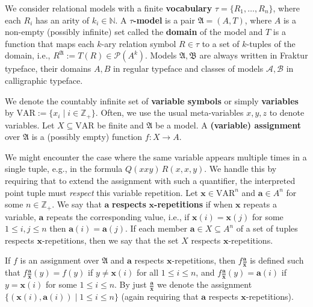 \documentclass{article}
\theoremstyle{definition}
\begin{document}
We consider relational models with a finite \textbf{vocabulary} $\tau=\{R_1,\dots,R_n\}$, where each $R_i$ has an arity of $k_i\in\mathbb{N}$. A $\tau$\textbf{-model} is a pair $\mathfrak{A}=(A,T)$, where $A$ is a non-empty (possibly infinite) set called the \textbf{domain} of the model and $T$ is a function that maps each $k$-ary relation symbol $R\in \tau$ to a set of $k$-tuples of the domain, i.e., $R^{\mathfrak{A}}:=T(R)\in \mathcal{P}(A^k)$. Models $\mathfrak{A},\mathfrak{B}$ are always written in Fraktur typeface, their domains $A,B$ in regular typeface and classes of models $\mathcal{A},\mathcal{B}$ in calligraphic typeface.

We denote the countably infinite set of \textbf{variable symbols} or simply \textbf{variables} by $\mathrm{VAR}:=\{x_i\mid i \in \mathbb{Z}_+\}$. Often, we use the usual meta-variables $x,y,z$ to denote variables. Let $X\subseteq \mathrm{VAR}$ be finite and $\mathfrak{A}$ be a model. A \textbf{(variable) assignment} over $\mathfrak{A}$ is a (possibly empty) function $f:X\to A$.

We might encounter the case where the same variable appears multiple times in a single tuple, e.g., in the formula $Q(xxy)\, R(x,x,y)$. We handle this by requiring that to extend the assignment with such a quantifier, the interpreted point tuple must \textit{respect} this variable repetition. Let $\textbf{x}\in\text{VAR}^n$ and $\textbf{a}\in A^n$ for some $n\in\mathbb{Z}_+$. We say that $\textbf{a}$ \textbf{respects} $\textbf{x}$\textbf{-repetitions} if when $\textbf{x}$ repeats a variable, $\textbf{a}$ repeats the corresponding value, i.e., if $\textbf{x}(i)=\textbf{x}(j)$ for some $1\leq i,j\leq n$ then $\textbf{a}(i)=\textbf{a}(j)$. If each member $\textbf{a}\in X\subseteq A^n$ of a set of tuples respects $\textbf{x}$-repetitions, then we say that the set $X$ respects $\textbf{x}$-repetitions.

If $f$ is an assignment over $\mathfrak{A}$ and $\textbf{a}$ respects $\textbf{x}$-repetitions, then $f\frac{\textbf{a}}{\textbf{x}}$ is defined such that $f\frac{\textbf{a}}{\textbf{x}}(y)=f(y)$ if $y\neq \textbf{x}(i)$ for all $1 \leq i \leq n$, and $f\frac{\textbf{a}}{\textbf{x}}(y)=\textbf{a}(i)$ if $y=\textbf{x}(i)$ for some $1\leq i \leq n$. By just $\frac{\textbf{a}}{\textbf{x}}$ we denote the assignment $\{(\textbf{x}(i),\textbf{a}(i))\mid 1 \leq i \leq n\}$ (again requiring that $\textbf{a}$ respects $\textbf{x}$-repetitions).
\end{document}
